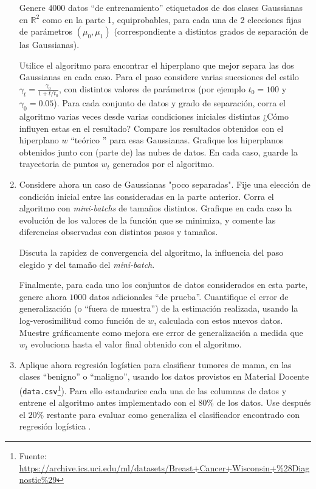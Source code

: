 \begin{enumerate}
    Genere $4000$ datos  ``de entrenamiento'' etiquetados de dos clases Gaussianas  en $\mathbb{R}^2$ como en la parte 1,  equiprobables, para  cada una de 2 elecciones  fijas de par\'ametros $(\mu_0,\mu_1)$ (correspondiente a distintos grados de separaci\'on de las Gaussianas).  
    
    Utilice el algoritmo para encontrar  el hiperplano  que mejor separa las dos Gaussianas en cada caso. Para el paso considere varias sucesiones del estilo  $\gamma_t = \frac{\gamma_0}{1+t/t_0}$, con  distintos valores de par\'ametros (por ejemplo $t_0 = 100$ y $\gamma_0 = 0.05$).  
    Para cada conjunto de datos y grado de separaci\'on, corra el algoritmo varias veces desde  varias  condiciones iniciales  distintas ¿C\'omo influyen estas en el resultado? Compare los resultados obtenidos con el  hiperplano $w$ ``te\'orico '' para esas Gaussianas. Grafique los hiperplanos obtenidos junto con (parte de) las nubes de datos.  En cada caso, guarde la trayectoria de puntos  $w_t$ generados por el algoritmo.  
  
  \item Considere ahora un caso de  Gaussianas  "poco separadas".  Fije una elecci\'on de condici\'on inicial entre las consideradas  en la parte anterior.  Corra el algoritmo con  \emph{mini-batchs} de  tama\~nos  distintos. Grafique en cada caso la evoluci\'on de los valores de la funci\'on que se minimiza, y comente las diferencias  observadas con distintos pasos y tamaños. 

    Discuta la rapidez de convergencia del algoritmo, la influencia del paso elegido y del tama\~no del \emph{mini-batch}.  
   
   Finalmente, para  cada uno los conjuntos de datos considerados en esta parte,  genere ahora $1000$ datos adicionales ``de  prueba''.  Cuantifique el error de generalizaci\'on (o ``fuera de muestra'') de la estimaci\'on realizada, usando la log-verosimilitud como funci\'on de $w$, calculada con estos nuevos datos.  Muestre gr\'aficamente como mejora ese error de generalizaci\'on  a medida que $w_t$ evoluciona hasta el valor final obtenido con el algoritmo.  
   
 \item Aplique ahora regresi\'on logística para clasificar  tumores de mama, en las clases ``benigno'' o ``maligno'',  usando los datos provistos en Material Docente (\texttt{data.csv}\footnote{Fuente: \url{https://archive.ics.uci.edu/ml/datasets/Breast+Cancer+Wisconsin+\%28Diagnostic\%29}}). Para ello estandarice cada una de las columnas de datos y entrene el algoritmo antes implementado con el $80\%$ de los datos.  Use despu\'es el $20\%$ restante para  evaluar como generaliza el clasificador encontrado con regresi\'on log\'istica . 
\end{enumerate}

